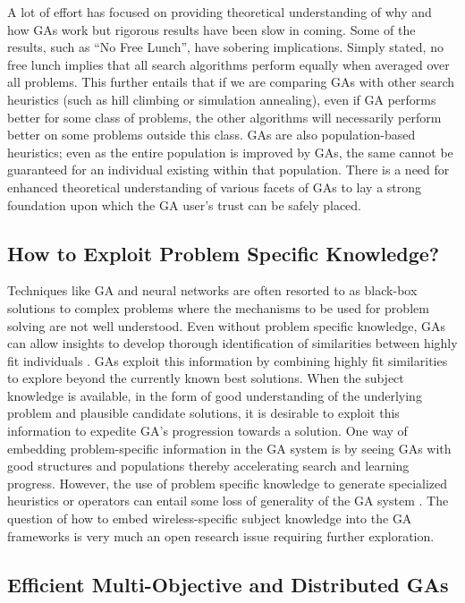\documentclass[journal]{IEEEtran}
\begin{document}
A lot of effort has focused on providing theoretical understanding of why and how GAs work but rigorous results have been slow in coming. Some of the results, such as ``No Free Lunch'', have sobering implications. Simply stated, no free lunch implies that all search algorithms perform equally when averaged over all problems. This further entails that if we are comparing GAs with other search heuristics (such as hill climbing or simulation annealing), even if GA performs better for some class of problems, the other algorithms will necessarily perform better on some problems outside this class. GAs are also population-based heuristics; even as the entire population is improved by GAs, the same cannot be guaranteed for an individual existing within that population. There is a need for enhanced theoretical understanding of various facets of GAs to lay a strong foundation upon which the GA user's trust can be safely placed. 

\subsection{How to Exploit Problem Specific Knowledge?}

Techniques like GA and neural networks are often resorted to as black-box solutions to complex problems where the mechanisms to be used for problem solving are not well understood. Even without problem specific knowledge, GAs can allow insights to develop thorough identification of similarities between highly fit individuals \cite{goldberg1988genetic}. GAs exploit this information by combining highly fit similarities to explore beyond the currently known best solutions. When the subject knowledge is available, in the form of good understanding of the underlying problem and plausible candidate solutions, it is desirable to exploit this information to expedite GA's progression towards a solution. One way of embedding problem-specific information in the GA system is by seeing GAs with good structures and populations thereby accelerating search and learning progress. However, the use of problem specific knowledge to generate specialized heuristics or operators can entail some loss of generality of the GA system \cite{goldberg1988genetic}. The question of how to embed wireless-specific subject knowledge into the GA frameworks is very much an open research issue requiring further exploration. 

\subsection{Efficient Multi-Objective and Distributed GAs}
\end{document}

